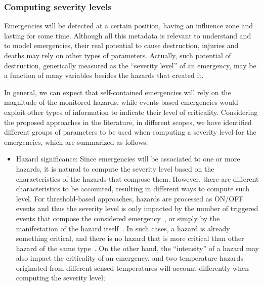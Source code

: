 \begin{refsection}
\subsubsection{Computing severity levels} 

Emergencies will be detected at a certain position, having an influence zone and lasting for some time. Although all this metadata is relevant to understand and to model emergencies, their real potential to cause destruction, injuries and deaths may rely on other types of parameters. Actually, such potential of destruction, generically measured as the ``severity level'' of an emergency, may be a function of many variables besides the hazards that created it.

In general, we can expect that self-contained emergencies will rely on the magnitude of the monitored hazards, while events-based emergencies would exploit other types of information to indicate their level of criticality. Considering the proposed approaches in the literature, in different scopes, we have identified different groups of parameters to be used when computing a severity level for the emergencies, which are summarized as follows:

\begin{itemize}
  \item Hazard significance: Since emergencies will be associated to one or more hazards, it is natural to compute the severity level based on the characteristics of the hazards that compose them. However, there are different characteristics to be accounted, resulting in different ways to compute such level. For threshold-based approaches, hazards are processed as ON/OFF events and thus the severity level is only impacted by the number of triggered events that compose the considered emergency~\cite{emergenciesmetric2}, or simply by the manifestation of the hazard itself~\cite{emergenciesmetric4}. In such cases, a hazard is already something critical, and there is no hazard that is more critical than other hazard of the same type~\cite{emergenciesmetric2}. On the other hand, the ``intensity'' of a hazard may also impact the criticality of an emergency, and two temperature hazards originated from different sensed temperatures will account differently when computing the severity level;
  

\end{itemize}
\end{refsection}
